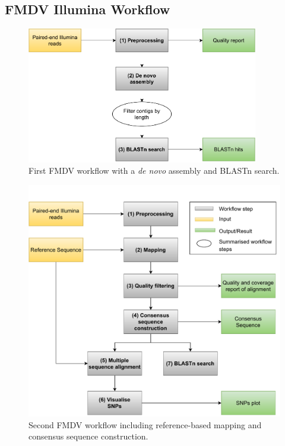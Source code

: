 \subsection{FMDV Illumina Workflow}\label{sec:fmdv-wf}
\begin{figure}[ht!]
	\centering
	\includegraphics[width=0.9\textwidth]{media/3-fmdv-1-2.pdf}
	\caption{First \ac{FMDV} workflow with a \textit{de novo} assembly and \ac{BLAST}n search.}
	\label{fig:3-fmdv-wf-1}
\end{figure}
\begin{figure}[ht!]
	\centering
	\includegraphics[width=1\textwidth]{media/3-fmdv-2-2.pdf}
	\caption{Second \ac{FMDV} workflow including reference-based mapping and consensus sequence construction.}
	\label{fig:3-fmdv-wf-2}
\end{figure}


